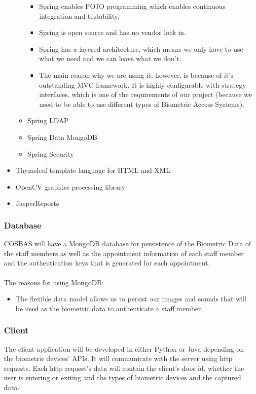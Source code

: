 \begin{itemize}
\begin{itemize}
\begin{itemize}
					\item Spring enables POJO programming which enables continuous integration and testability.
					\item Spring is open source and has no vendor lock in.
					\item Spring has a layered architecture, which means we only have to use what we need and we can leave what we don't.
					\item The main reason why we are using it, however, is because of it's outstanding MVC framework. It is highly configurable with strategy interfaces, which is one of the requirements of our project (because we need to be able to use different types of Biometric Access Systems).
				\end{itemize}
			\item Spring LDAP
			\item Spring Data MongoDB
			\item Spring Security
		\end{itemize}
	\item Thymeleaf template language for HTML and XML
	\item OpenCV graphics processing library
	\item JasperReports
\end{itemize}

\subsubsection{Database}
COSBAS will have a MongoDB database for persistence of the Biometric Data of the staff members as well as the appointment information of each staff member and the authentication keys that is generated for each appointment. \\
\\
The reasons for using MongoDB:
	\begin{itemize}
		\item The flexible data model allows us to persist our images and sounds that will be used as the biometric data to authenticate a staff member.
		
	\end{itemize}

\subsubsection{Client}
The client application will be developed in either Python or Java depending on the biometric devices' APIs. It will communicate with the server using http requests. Each http request's data will contain the client's door id, whether the user is entering or exiting and the types of biometric devices and the captured data. 

